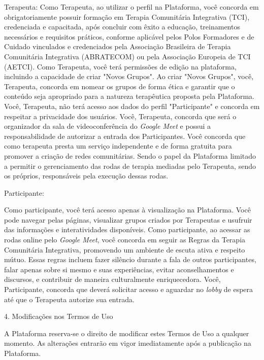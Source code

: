 \begin{apendicesenv}
        Terapeuta:
        Como Terapeuta, ao utilizar o perfil na Plataforma, você concorda em obrigatoriamente possuir formação em Terapia Comunitária Integrativa (TCI), credenciada e capacitada, após concluir com êxito a educação, treinamentos necessários e requisitos práticos, conforme aplicável pelos Polos Formadores e de Cuidado vinculados e credenciados pela Associação Brasileira de Terapia Comunitária Integrativa (ABRATECOM) ou pela Associação Europeia de TCI (AETCI).
        Como Terapeuta, você terá permissões de edição na plataforma, incluindo a capacidade de criar "Novos Grupos". Ao criar "Novos Grupos", você, Terapeuta, concorda em nomear os grupos de forma ética e garantir que o conteúdo seja apropriado para a natureza terapêutica proposta pela Plataforma.
        Você, Terapeuta, não terá acesso aos dados do perfil "Participante" e concorda em respeitar a privacidade dos usuários.
        Você, Terapeuta, concorda que será o organizador da sala de videoconferência do \textit{Google Meet} e possui a responsabilidade de autorizar a entrada dos Participantes.
        Você concorda que como terapeuta presta um serviço independente e de forma gratuita para promover a criação de redes comunitárias. Sendo o papel da Plataforma limitado a permitir o gerenciamento das rodas de terapia mediadas pelo Terapeuta, sendo os próprios, responsáveis pela execução dessas rodas.
        
        Participante:
        
        Como participante, você terá acesso apenas à visualização na Plataforma.
        Você pode navegar pelas páginas, visualizar grupos criados por Terapeutas e usufruir das informações e interatividades disponíveis.
        Como participante, ao acessar as rodas online pelo \textit{Google Meet}, você concorda em seguir as Regras da Terapia Comunitária Integrativa, promovendo um ambiente de escuta ativa e respeito mútuo. Essas regras incluem fazer silêncio durante a fala de outros participantes, falar apenas sobre si mesmo e suas experiências, evitar aconselhamentos e discursos, e contribuir de maneira culturalmente enriquecedora.
        Você, Participante, concorda que deverá solicitar acesso e aguardar no \textit{lobby} de espera até que o Terapeuta autorize sua entrada.
        
        4. Modificações nos Termos de Uso
        
        A Plataforma reserva-se o direito de modificar estes Termos de Uso a qualquer momento. As alterações entrarão em vigor imediatamente após a publicação na Plataforma.
        

\end{apendicesenv}
